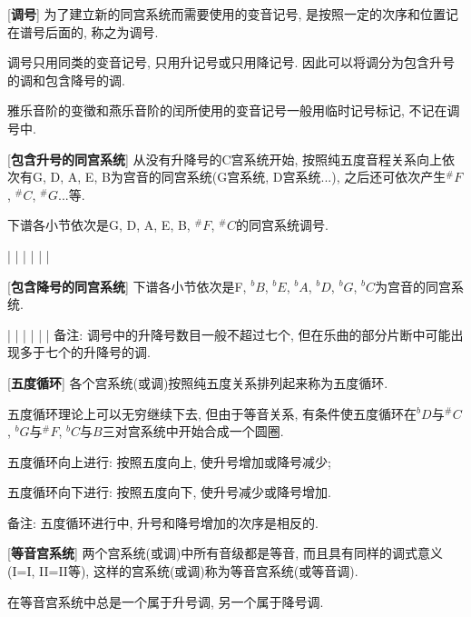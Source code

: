 \clearpage

[\textbf{调号}] 为了建立新的同宫系统而需要使用的变音记号, 是按照一定的次序和位置记在谱号后面的, 称之为调号.\par
\qquad 调号只用同类的变音记号, 只用升记号或只用降记号. 因此可以将调分为包含升号的调和包含降号的调.\par
\qquad 雅乐音阶的变徵和燕乐音阶的闰所使用的变音记号一般用临时记号标记, 不记在调号中.\par

[\textbf{包含升号的同宫系统}] 从没有升降号的C宫系统开始, 按照纯五度音程关系向上依次有G, D, A, E, B为宫音的同宫系统(G宫系统, D宫系统...), 之后还可依次产生$^\#F$, $^\#C$, $^\#G$...等.\par
\qquad 下谱各小节依次是G, D, A, E, B, $^\#F$, $^\#C$的同宫系统调号.\par
\startextract
\Notes {}\en\bar
\Notes {} \en\bar
\Notes {}  \en\bar
\Notes {}   \en\bar
\Notes {}    \en\bar
\Notes {}     \en\bar
\Notes {}      \en
\zendextract

[\textbf{包含降号的同宫系统}] 下谱各小节依次是F, $^bB$, $^bE$, $^bA$, $^bD$, $^bG$, $^bC$为宫音的同宫系统.\par
\startextract
\Notes {}\en\bar
\Notes {} \en\bar
\Notes {}  \en\bar
\Notes {}   \en\bar
\Notes {}    \en\bar
\Notes {}     \en\bar
\Notes {}      \en
\zendextract
\qquad 备注: 调号中的升降号数目一般不超过七个, 但在乐曲的部分片断中可能出现多于七个的升降号的调.\par

[\textbf{五度循环}] 各个宫系统(或调)按照纯五度关系排列起来称为五度循环.\par
\qquad 五度循环理论上可以无穷继续下去, 但由于等音关系, 有条件使五度循环在$^bD$与$^\#C$, $^bG$与$^\#F$, $^bC$与$B$三对宫系统中开始合成一个圆圈.\par
\qquad 五度循环向上进行: 按照五度向上, 使升号增加或降号减少;\par
\qquad 五度循环向下进行: 按照五度向下, 使升号减少或降号增加.\par
\qquad 备注: 五度循环进行中, 升号和降号增加的次序是相反的.\par

[\textbf{等音宫系统}] 两个宫系统(或调)中所有音级都是等音, 而且具有同样的调式意义(I=I, II=II等), 这样的宫系统(或调)称为等音宫系统(或等音调).\par
\qquad 在等音宫系统中总是一个属于升号调, 另一个属于降号调.\par


